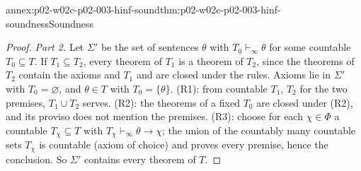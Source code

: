 \begin{annexitem}{annex:p02-w02c-p02-003-hinf-sound}{thm:p02-w02c-p02-003-hinf-soundness}{Soundness}
\begin{proof}
\emph{Part 2.}  Let \(\Sigma'\) be the set of sentences \(\theta\) with
\(T_0\vdash_{\infty}\theta\) for some countable \(T_0\subseteq T\).  If
\(T_1\subseteq T_2\), every theorem of \(T_1\) is a theorem of \(T_2\),
since the theorems of \(T_2\) contain the axioms and \(T_1\) and are closed
under the rules.  Axioms lie in \(\Sigma'\) with \(T_0=\varnothing\), and
\(\theta\in T\) with \(T_0=\{\theta\}\).  (R1): from countable \(T_1\), \(T_2\)
for the two premises, \(T_1\cup T_2\) serves.  (R2): the theorems of a
fixed \(T_0\) are closed under (R2), and its proviso does not mention the
premises.  (R3): choose for each \(\chi\in\Phi\) a countable
\(T_\chi\subseteq T\) with \(T_\chi\vdash_{\infty}\theta\to\chi\); the
union of the countably many countable sets \(T_\chi\) is countable (axiom
of choice) and proves every premise, hence the conclusion.  So
\(\Sigma'\) contains every theorem of \(T\).
\end{proof}
\end{annexitem}

